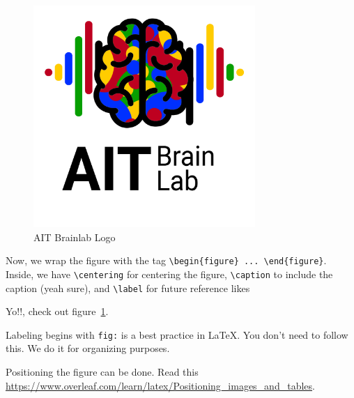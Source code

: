 \documentclass{article}
\begin{document}
\newpage
\begin{figure}[h]
    \centering
    \includegraphics[width=0.75\textwidth]{figures/bci-logo.png}
    \caption{AIT Brainlab Logo}
    \label{fig:brainlab-logo}
\end{figure}

Now, we wrap the figure with the tag \verb!\begin{figure} ... \end{figure}!. 
Inside, we have \verb!\centering! for centering the figure, 
\verb!\caption! to include the caption (yeah sure),
and \verb!\label! for future reference likes

Yo!!, check out figure~\ref{fig:brainlab-logo}.

Labeling begins with \verb!fig:! is a best practice in \LaTeX. 
You don't need to follow this.
We do it for organizing purposes.  

Positioning the figure can be done. Read this \url{https://www.overleaf.com/learn/latex/Positioning_images_and_tables}.
\end{document}
